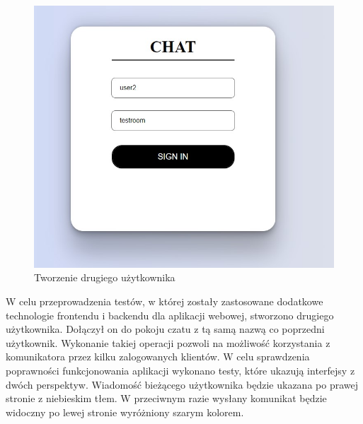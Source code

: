 \begin{figure}[htbp]
	\centering
	\includegraphics[width=0.5\linewidth]{"obrazy/TEST2uzytkownik"}
	\caption{Tworzenie drugiego użytkownika}
	\label{fig:43}
\end{figure}
\newpage
W celu przeprowadzenia testów, w której zostały zastosowane dodatkowe technologie frontendu i backendu dla aplikacji webowej, stworzono drugiego użytkownika. Dołączył on do pokoju czatu z tą samą nazwą co poprzedni użytkownik. Wykonanie takiej operacji pozwoli na możliwość korzystania z komunikatora przez kilku zalogowanych klientów.
W celu sprawdzenia poprawności funkcjonowania aplikacji wykonano testy, które ukazują interfejsy z  dwóch perspektyw. Wiadomość bieżącego użytkownika będzie ukazana po prawej stronie z niebieskim tłem. W przeciwnym razie wysłany komunikat będzie widoczny po lewej stronie wyróżniony szarym kolorem.


